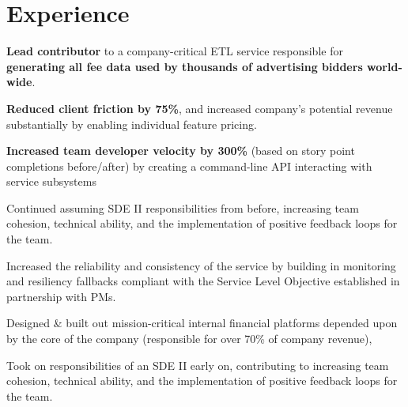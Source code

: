 \documentclass[]{hieudo-build}
\begin{document}
\begin{minipage}[t]{0.65\textwidth} 

\section{Experience}


 \vspace{\topsep} %
 
\begin{tightemize}
\item {\bf Lead contributor} to a company-critical ETL service responsible
for {\bf generating all fee data used by thousands of advertising bidders world-wide}.
\item {\bf Reduced client friction by 75\%}, and increased company's potential
revenue substantially by enabling individual feature pricing.
\item {\bf Increased team developer velocity by 300\%} (based on story point
completions before/after) by creating a command-line API interacting
with service subsystems
\item Continued assuming SDE II responsibilities from before, increasing team cohesion,
technical ability, and the implementation of positive feedback loops for the team.
\item Increased the reliability and consistency of the service by building in
monitoring and resiliency fallbacks compliant with the Service Level
Objective established in partnership with PMs.
\end{tightemize}
\sectionsep


\vspace{\topsep} %

\begin{tightemize}
\item Designed \& built out mission-critical internal financial platforms depended upon by the core of the company (responsible for over 70\% of company revenue), 
\item Took on responsibilities of an SDE II early on, contributing to increasing team cohesion, technical ability, and the implementation of positive feedback loops for the team.
\end{tightemize}
\sectionsep


\end{minipage}
\end{document}

